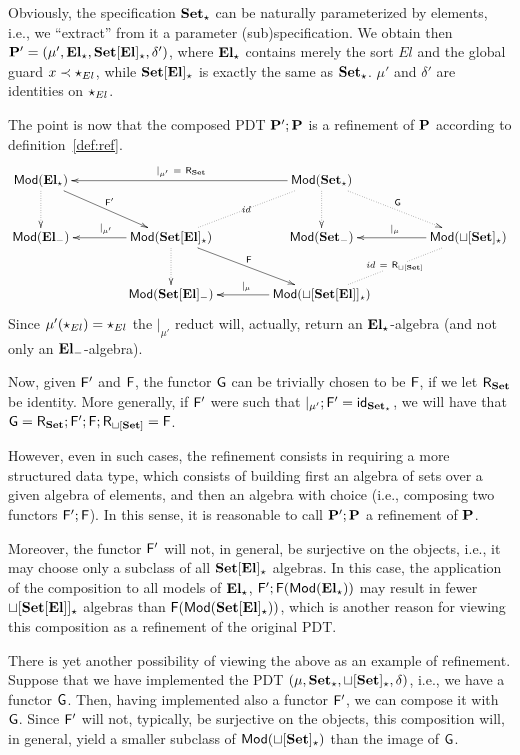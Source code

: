\begin{example}
Obviously, the specification $\thr{Set_\cons}$ can be naturally parameterized
by elements, i.e., we ``extract'' from it a parameter (sub)specification. We
obtain then $\thr P'=\pdtsp{\mu'}{\delta'}{\thr{El}_\cons}{\thr{Set[El]_\cons}}$,
where $\thr{El_\cons}$ contains merely the sort $El$ and the global guard
$x\prec \cons_{El}$, while $\thr{Set[El]_\cons}$ is exactly the same as
$\thr{Set_\cons}$. $\mu'$ and $\delta'$ are identities on $\cons_{El}$. 

The point is now that the composed PDT $\thr P';\thr P$ is a refinement of
$\thr P$ according to definition~\ref{def:ref}. 
\[\xymatrix@C=0.6cm@R=1cm{
\Mod(\thr{El_\cons}) \ar[drr]^{\fu F'} \ar@{.>}[d] && &&
  \Mod(\thr{Set_\cons})  \ar@{.>}[d]
    \ar[llll]_{|_{\mu'}\ =\ \reff{Set}}  \ar@{.>}[drr]^{\fu G} \ar@{.}[dll]|{id} \\
\Mod(\thr{El_\weak}) && \Mod(\thr{Set[El]_\cons})  \ar@{.>}[d] \ar[drr]^{\fu F} \ar[ll]_{|_{\mu'}}
   && \Mod(\thr{Set_\weak}) && \Mod(\thr{\choice[Set]_\cons})
   \ar@{.}[dll]|{id\ =\ \reff{\choice[Set]}} \ar[ll]_{|_{\mu}}\\ 
&& \Mod(\thr{Set[El]_\weak}) && \Mod(\thr{\choice[Set[El]]_\cons}) \ar[ll]_{|_{\mu}}
}
\]
Since $\mu'(\cons_{El})=\cons_{El}$ the $|_{\mu'}$ reduct will, actually,
return an $\thr{El_\cons}$-algebra (and not only an $\thr{El_\weak}$-algebra).

Now, given $\fu F'$ and $\fu F$, the functor $\fu G$ can be trivially chosen
to be $\fu F$, if we let $\reff{Set}$ be identity. More generally, if $\fu F'$ were such that $|_{\mu'};\fu
F'=\fu{id}_{\thr{Set_{\cons}}}$, we will have that $\fu G=\reff{Set};\fu
F';\fu F;\reff{\choice[Set]}=\fu F$. 

However, even in such cases, the refinement consists in requiring a more
structured data type, which consists of building first an algebra of sets
over a given algebra of elements, and then an algebra with choice (i.e., 
composing two functors $\fu F';\fu F$). In
this sense, it is reasonable to call $\thr P';\thr P$ a refinement of $\thr
P$.

 Moreover, the functor $\fu F'$ will not, in general, be surjective on the
 objects, i.e., it may choose only a subclass of all $\thr{Set[El]_\cons}$
 algebras. In this case, the application of the composition to all models of
 $\thr{El_\cons}$, $\fu F';\fu F(\Mod(\thr{El_\cons}))$ may result in fewer
 $\thr{\choice[Set[El]]_\cons}$ algebras than $\fu F(\Mod(\thr{Set[El]_\cons}))$,
 which is another reason for viewing this composition as a refinement of the
 original PDT.
\end{example}
%
There is yet another possibility of viewing the above as an example of
refinement. Suppose that we have implemented the PDT
$\pdtsp{\mu}{\delta}{\thr{Set_\cons}}{\thr{\choice[Set]_\cons}}$, i.e., we
have a functor $\fu G$.  Then, having implemented also a functor $\fu F'$, we
can compose it with $\fu G$. Since $\fu F'$ will not, typically, be
surjective on the objects, this composition will, in general, yield a smaller
subclass of $\Mod(\thr{\choice[Set]_\cons})$ than the image of $\fu G$.

